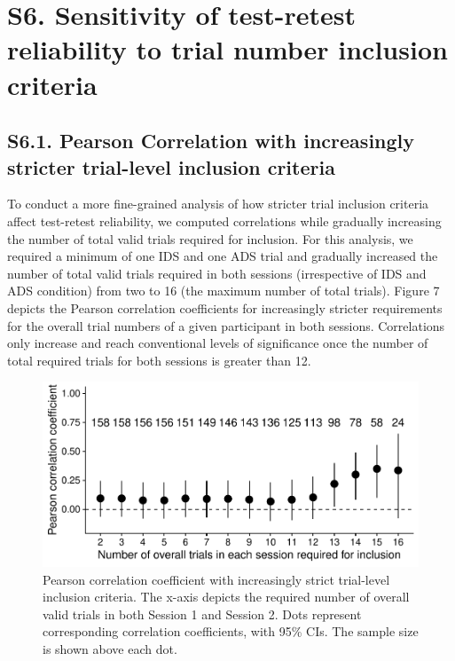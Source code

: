 \documentclass[
  man, donotrepeattitle,floatsintext]{apa6}
\begin{document}
\newpage

\hypertarget{s6.-sensitivity-of-test-retest-reliability-to-trial-number-inclusion-criteria}{%
\section{S6. Sensitivity of test-retest reliability to trial number inclusion criteria}\label{s6.-sensitivity-of-test-retest-reliability-to-trial-number-inclusion-criteria}}

\hypertarget{s6.1.-pearson-correlation-with-increasingly-stricter-trial-level-inclusion-criteria}{%
\subsection{S6.1. Pearson Correlation with increasingly stricter trial-level inclusion criteria}\label{s6.1.-pearson-correlation-with-increasingly-stricter-trial-level-inclusion-criteria}}

To conduct a more fine-grained analysis of how stricter trial inclusion criteria affect test-retest reliability, we computed correlations while gradually increasing the number of total valid trials required for inclusion.
For this analysis, we required a minimum of one IDS and one ADS trial and gradually increased the number of total valid trials required in both sessions (irrespective of IDS and ADS condition) from two to 16 (the maximum number of total trials).
Figure 7 depicts the Pearson correlation coefficients for increasingly stricter requirements for the overall trial numbers of a given participant in both sessions.
Correlations only increase and reach conventional levels of significance once the number of total required trials for both sessions is greater than 12.

\begin{figure}
\centering
\includegraphics{MB1T_supplement_files/figure-latex/fig7-1.pdf}
\caption{\label{fig:fig7}Pearson correlation coefficient with increasingly strict trial-level inclusion criteria. The x-axis depicts the required number of overall valid trials in both Session 1 and Session 2. Dots represent corresponding correlation coefficients, with 95\% CIs. The sample size is shown above each dot.}
\end{figure}
\end{document}
